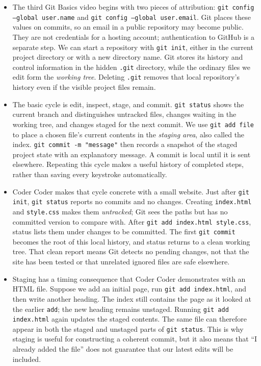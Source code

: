 \documentclass[10pt]{article}
\begin{document}
\begin{itemize}[leftmargin=1.25em, itemsep=0.3em, parsep=0pt, topsep=0pt]
    \item The third Git Basics video begins with two pieces of attribution: \texttt{git config --global user.name} and \texttt{git config --global user.email}. Git places these values on commits, so an email in a public repository may become public. They are not credentials for a hosting account; authentication to GitHub is a separate step. We can start a repository with \texttt{git init}, either in the current project directory or with a new directory name. Git stores its history and control information in the hidden \texttt{.git} directory, while the ordinary files we edit form the \emph{working tree}. Deleting \texttt{.git} removes that local repository's history even if the visible project files remain.

    \item The basic cycle is edit, inspect, stage, and commit. \texttt{git status} shows the current branch and distinguishes untracked files, changes waiting in the working tree, and changes staged for the next commit. We use \texttt{git add file} to place a chosen file's current contents in the \emph{staging area}, also called the index. \texttt{git commit -m "message"} then records a snapshot of the staged project state with an explanatory message. A commit is local until it is sent elsewhere. Repeating this cycle makes a useful history of completed steps, rather than saving every keystroke automatically.

    \item Coder Coder makes that cycle concrete with a small website. Just after \texttt{git init}, \texttt{git status} reports no commits and no changes. Creating \texttt{index.html} and \texttt{style.css} makes them \emph{untracked}; Git sees the paths but has no committed version to compare with. After \texttt{git add index.html style.css}, status lists them under changes to be committed. The first \texttt{git commit} becomes the root of this local history, and status returns to a clean working tree. That clean report means Git detects no pending changes, not that the site has been tested or that unrelated ignored files are safe elsewhere.

    \item Staging has a timing consequence that Coder Coder demonstrates with an HTML file. Suppose we add an initial page, run \texttt{git add index.html}, and then write another heading. The index still contains the page as it looked at the earlier \texttt{add}; the new heading remains unstaged. Running \texttt{git add index.html} again updates the staged contents. The same file can therefore appear in both the staged and unstaged parts of \texttt{git status}. This is why staging is useful for constructing a coherent commit, but it also means that ``I already added the file'' does not guarantee that our latest edits will be included.


\end{itemize}
\end{document}

